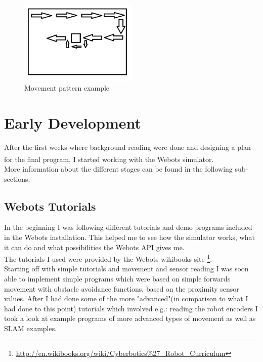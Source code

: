 \documentclass[10pt,a4paper]{article}
\begin{document}
\begin{flushleft}
\begin{figure}[h]
\centering
\includegraphics[width=0.5\textwidth]{figures/scanline_example.png} 
\caption{Movement pattern example}
\label{Picture 3}
\end{figure}

\section{Early Development}
After the first weeks where background reading were done and designing a plan for the final program, I started working with the Webots\textsuperscript{\texttrademark} simulator. \\ More information about the different stages can be found in the following sub-sections. 

\subsection{Webots Tutorials}
In the beginning I was following different tutorials and demo  programs included in the Webots installation. 
This helped me to see how the simulator works, what it can do and what possibilities the Webots API gives me. \\
The tutorials I used were provided by the Webots wikibooks site \footnote{\url{http://en.wikibooks.org/wiki/Cyberbotics\%27_Robot_Curriculum}}.\\
Starting off with simple tutorials and movement and sensor reading I was soon able to implement simple programs which were based on simple forwards movement with obstacle avoidance functions, based on the proximity sensor values. 
After I had done some of the more "advanced"(in comparison to what I had done to this point) tutorials which involved e.g.: reading the robot encoders   I took a look at example programs of more advanced types of movement as well as SLAM examples. \\


\end{flushleft}
\end{document}
